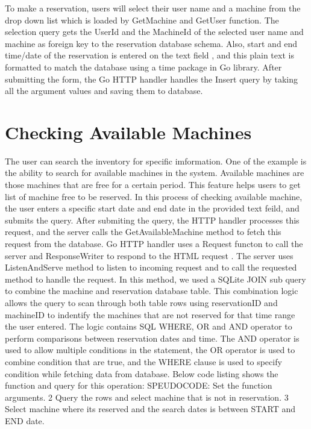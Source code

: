 To make a reservation, users will select their user name and a machine from the drop down list which is loaded by GetMachine and GetUser function. The selection query gets the UserId and the MachineId of the selected user name and machine as foreign key to the reservation database schema. Also, start and end time/date of the reservation is entered on the text field , and this plain text is formatted to match the database using a time package in Go library. After submitting the form, the Go HTTP handler handles the Insert query by taking all the argument values and saving them to database. 
\section*{Checking Available Machines}
The user can search the inventory for specific imformation. One of the example is the ability to search for available machines in the system. Available machines are those machines that are free for a certain period. This feature helps users to get list of machine free to be reserved. In this process of checking available machine, the user enters a specific start date and end date in the provided text feild, and submits the query. After submiting the query, the HTTP handler processes this request, and the server calls the GetAvailableMachine method to fetch this request from the database. Go HTTP handler uses a Request functon to call the server and  ResponseWriter to respond to the HTML request \cite{Gohttp}. The server uses ListenAndServe method to listen to incoming request and to call the requested method to handle the request. In this method, we used a SQLite JOIN sub query to combine the machine and reservation database table. This combination logic allows the query to scan through both table rows using reservationID and machineID to indentify the machines that are not reserved for that time range the user entered. The logic contains SQL WHERE, OR and AND operator to perform comparisons between reservation dates and time. \cite{ANDOR}The AND operator is used to allow multiple conditions in the statement,  the OR operator is used to combine condition that are true, and the WHERE clause is used to specify condition while fetching data from database\cite{WHEREclause}. 
\pagebreak
Below code listing shows the function and query for this operation:
SPEUDOCODE: Set the function arguments.
2 Query the rows and select machine that is not in reservation.
3 Select machine where its reserved and the search dates is between  START and END date. 
